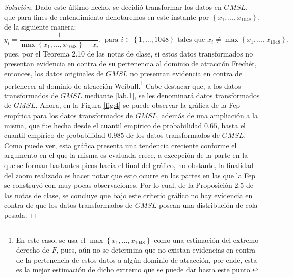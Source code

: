 \documentclass[10.5pt,notitlepage]{article}
\newenvironment{solucion}
  {\begin{proof}[Solución]}
  {\end{proof}}
\newcommand{\kis}[1]{\left\{ #1 \right\}}
\theoremstyle{plain}
\begin{document}
\begin{solucion}
Dado este último hecho, se decidió transformar los datos en \(GMSL\), que para fines de entendimiento denotaremos en este instante por \(\kis{x_1, \hdots, x_{1048}}\), de la siguiente manera:
\begin{equation}\label{lab.1}
y_i = \frac{1}{\max\kis{x_1, \hdots, x_{1048}} - x_i}, \text{ para  } i \in \kis{1, \hdots, 1048} \text{ tales que } x_i \neq  \max\kis{x_1, \hdots, x_{1048}},    
\end{equation}
pues, por el Teorema 2.10 de las notas de clase, si estos datos transformados no presentan evidencia en contra de su pertenencia al dominio de atracción Frechét, entonces, los datos originales de \(GMSL\) no presentan evidencia en contra de pertenecer al dominio de atracción Weibull.\footnote{En este caso, se usa el \(\max\kis{x_1, \hdots, x_{1048}}\) como una estimación del extremo derecho de \(F\), pues, aún no se determina que no existan evidencias en contra de la pertenencia de estos datos a algún dominio de atracción, por ende, esta es la mejor estimación de dicho extremo que se puede dar hasta este punto.} Cabe destacar que, a los datos transformados de \(GMSL\) mediante \eqref{lab.1}, se les denominará datos transformados de \(GMSL\). Ahora, en la Figura \ref{fig:4} se puede observar la gráfica de la Fep empírica para los datos transformados de \(GMSL\), además de una ampliación a la misma, que fue hecha desde el cuantil empírico de probabilidad \(0.65\), hasta el cuantil empírico de probabilidad \(0.985\) de los datos transformados de \(GMSL\). Como puede ver, esta gráfica presenta una tendencia creciente conforme el argumento en el que la misma es evaluada crece, a excepción de la parte en la que se forman bastantes picos hacia el final del gráfico, no obstante, la finalidad del zoom realizado es hacer notar que esto ocurre en las partes en las que la Fep se construyó con muy pocas observaciones. Por lo cual, de la Proposición 2.5 de las notas de clase, se concluye que bajo este criterio gráfico no hay evidencia en contra de que los datos transformados de \(GMSL\) posean una distribución de cola pesada. 


\end{solucion}
\end{document}
